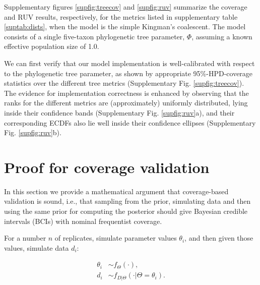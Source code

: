 \documentclass[oneside]{article}
\begin{document}
Supplementary figures \ref{supfig:treecov} and \ref{supfig:ruv} summarize the coverage and RUV results, respectively, for the metrics listed in supplementary table \ref{suptab:dists}, when the model is the simple Kingman's coalescent.
The model consists of a single five-taxon phylogenetic tree parameter, $\Phi$, assuming a known effective population size of 1.0.

We can first verify that our model implementation is well-calibrated with respect to the phylogenetic tree parameter, as shown by appropriate 95\%-HPD-coverage statistics over the different tree metrics (Supplementary Fig. \ref{supfig:treecov}).
The evidence for implementation correctness is enhanced by observing that the ranks for the different metrics are (approximately) uniformly distributed, lying inside their confidence bands (Supplementary Fig. \ref{supfig:ruv}a), and their corresponding ECDFs also lie well inside their confidence ellipses (Supplementary Fig. \ref{supfig:ruv}b).

\newpage
\section{Proof for coverage validation}
 \label{appendix::sec:proofs}

In this section we provide a mathematical argument that coverage-based validation is sound, i.e., that sampling from the prior, simulating data and then using the same prior for computing the posterior should give Bayesian credible intervals (BCIs) with nominal frequentist coverage.

For a number $n$ of replicates, simulate parameter
  values $\theta_i$, and then given those values, simulate data $d_i$:

\begin{align*}
\theta_i & \sim f_\Theta(\cdot), \\
d_i & \sim f_{D|\Theta}(\cdot | \Theta=\theta_i).
\end{align*}
\end{document}
